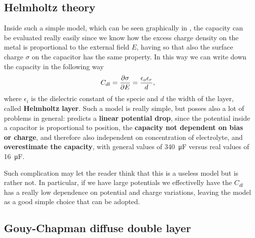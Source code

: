 \subsection{Helmholtz theory}

Inside such a simple model, which can be seen graphically in , the capacity can be evaluated really easily since we know how the excess charge density on the metal is proportional to the external field $E$, having so that also the surface charge $\sigma$ on the capacitor has the same property. In this way we can write down the capacity in the following way
\begin{equation}
    C_{dl} = \pdv{\sigma}{E} = \frac{\epsilon_o\epsilon_r}{d},
\end{equation}
where $\epsilon_i$ is the dielectric constant of the specie and $d$ the width of the layer, called \textbf{Helmholtz layer}. Such a model is really simple, but posses also a lot of problems in general: predicts a \textbf{linear potential drop}, since the potential inside a capacitor is proportional to position, the \textbf{capacity not dependent on bias or charge}, and therefore also independent on concentration of electrolyte, and \textbf{overestimate the capacity}, with general values of \SI{340}{\micro\farad} versus real values of \SI{16}{\micro\farad}.

Such complication may let the reader think that this is a useless model but is rather not. In particular, if we have large potentials we effectivelly have the $C_{dl}$ has a really low dependence on potential and charge variations, leaving the model as a good simple choice that can be adopted.

\subsection{Gouy-Chapman diffuse double layer}


